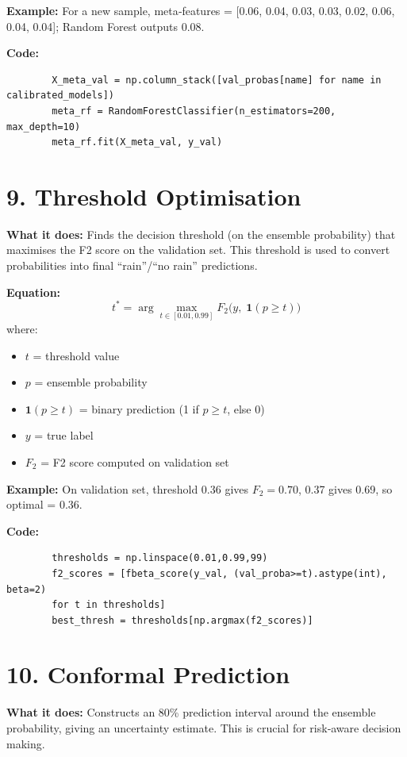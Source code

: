 \documentclass[12pt]{article}
\begin{document}
	\textbf{Example:} For a new sample, meta‑features = [0.06, 0.04, 0.03, 0.03, 0.02, 0.06, 0.04, 0.04]; Random Forest outputs 0.08.
	
	\textbf{Code:}
	\begin{lstlisting}
		X_meta_val = np.column_stack([val_probas[name] for name in calibrated_models])
		meta_rf = RandomForestClassifier(n_estimators=200, max_depth=10)
		meta_rf.fit(X_meta_val, y_val)
	\end{lstlisting}
	
	\section*{9. Threshold Optimisation}
	\textbf{What it does:} Finds the decision threshold (on the ensemble probability) that maximises the F2 score on the validation set. This threshold is used to convert probabilities into final “rain”/“no rain” predictions.
	
	\textbf{Equation:}
	\[
	t^* = \arg\max_{t\in[0.01,0.99]} F_2\bigl(y,\; \mathbf{1}(p\ge t)\bigr)
	\]
	where:
	\begin{itemize}
		\item $t$ = threshold value
		\item $p$ = ensemble probability
		\item $\mathbf{1}(p\ge t)$ = binary prediction (1 if $p\ge t$, else 0)
		\item $y$ = true label
		\item $F_2$ = F2 score computed on validation set
	\end{itemize}
	
	\textbf{Example:} On validation set, threshold 0.36 gives $F_2=0.70$, 0.37 gives 0.69, so optimal = 0.36.
	
	\textbf{Code:}
	\begin{lstlisting}
		thresholds = np.linspace(0.01,0.99,99)
		f2_scores = [fbeta_score(y_val, (val_proba>=t).astype(int), beta=2)
		for t in thresholds]
		best_thresh = thresholds[np.argmax(f2_scores)]
	\end{lstlisting}
	
	\section*{10. Conformal Prediction}
	\textbf{What it does:} Constructs an 80\% prediction interval around the ensemble probability, giving an uncertainty estimate. This is crucial for risk‑aware decision making.
	
\end{document}
